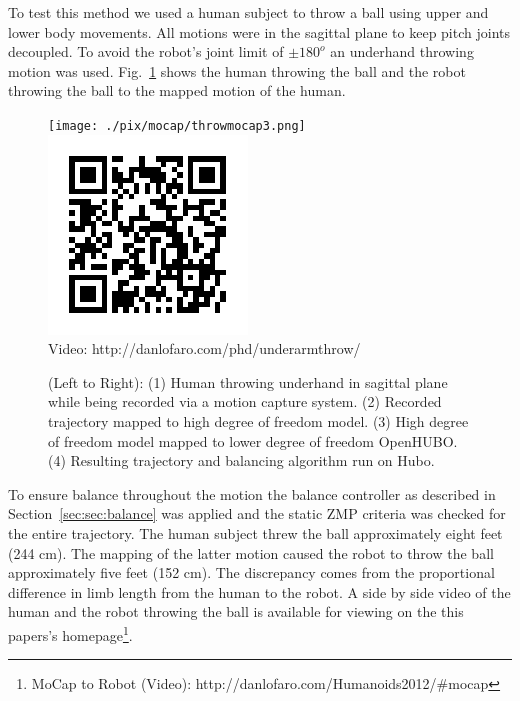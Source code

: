 To test this method we used a human subject to throw a ball using upper and lower body movements.  
All motions were in the sagittal plane to keep pitch joints decoupled.  
To avoid the robot's joint limit of $\pm180^o$ an underhand throwing motion was used.
Fig.~\ref{fig:mocap-underhand} shows the human throwing the ball and the robot throwing the ball to the mapped motion of the human.

\begin{figure}[thpb]
  \centering
\texttt{[image: ./pix/mocap/throwmocap3.png]}
\includegraphics[width=0.3\columnwidth]{./qrcode/qrcode-underarm.png}\\
      Video: http://danlofaro.com/phd/underarmthrow/
  \caption{(Left to Right): (1) Human throwing underhand in sagittal plane while being recorded via a motion capture system.  (2) Recorded trajectory mapped to high degree of freedom model.  (3) High degree of freedom model mapped to lower degree of freedom OpenHUBO.  (4) Resulting trajectory and balancing algorithm run on Hubo.\cite{lofaroURAI}}
  \label{fig:mocap-underhand}
\end{figure}

To ensure balance throughout the motion the balance controller as described in Section~\ref{sec:sec:balance} was applied and the static ZMP criteria was checked for the entire trajectory.
The human subject threw the ball approximately eight feet (244 cm).  
The mapping of the latter motion caused the robot to throw the ball approximately five feet (152 cm).
The discrepancy comes from the proportional difference in limb length from the human to the robot.
A side by side video of the human and the robot throwing the ball is available for viewing on the this papers's homepage\footnote{MoCap to Robot (Video): http://danlofaro.com/Humanoids2012/\#mocap}.





